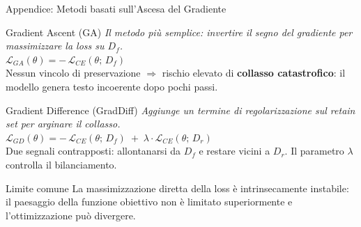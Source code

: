 \documentclass[aspectratio=169,11pt]{beamer}
\begin{document}
\begin{frame}{Appendice: Metodi basati sull'Ascesa del Gradiente}
  \scriptsize
  \begin{block}{Gradient Ascent (GA)}
    \textit{Il metodo pi\`u semplice: invertire il segno del gradiente per massimizzare la loss su $D_f$.}\\[0.3em]
    $\mathcal{L}_{GA}(\theta) = -\,\mathcal{L}_{CE}(\theta;\, D_f)$\\[0.3em]
    {\tiny Nessun vincolo di preservazione $\Rightarrow$ rischio elevato di \textbf{collasso catastrofico}: il modello genera testo incoerente dopo pochi passi.}
  \end{block}
  \vspace{-0.3em}
  \begin{block}{Gradient Difference (GradDiff)}
    \textit{Aggiunge un termine di regolarizzazione sul retain set per arginare il collasso.}\\[0.3em]
    $\mathcal{L}_{GD}(\theta) = -\,\mathcal{L}_{CE}(\theta;\, D_f) \;+\; \lambda \cdot \mathcal{L}_{CE}(\theta;\, D_r)$\\[0.3em]
    {\tiny Due segnali contrapposti: allontanarsi da $D_f$ e restare vicini a $D_r$. Il parametro $\lambda$ controlla il bilanciamento.}
  \end{block}
  \vspace{-0.3em}
  \begin{alertblock}{Limite comune}
    La massimizzazione diretta della loss \`e intrinsecamente instabile: il paesaggio della funzione obiettivo non \`e limitato superiormente e l'ottimizzazione pu\`o divergere.
  \end{alertblock}
\end{frame}
\end{document}
